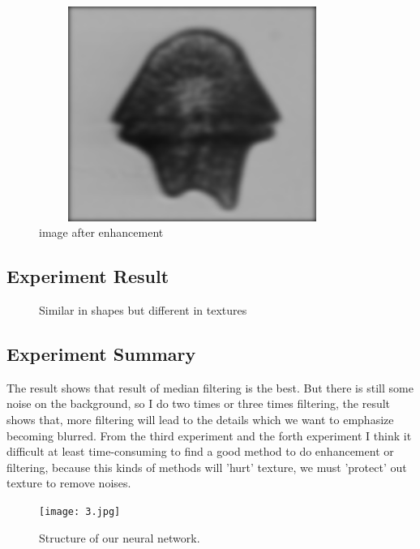 \documentclass{article}
\begin{document}
\begin{figure}[!ht]
\centering
\includegraphics[width=10cm,height=7cm]{5.png}
\caption{image after enhancement}
\hspace{0.05in}
\label{fig: image after enhancement}
\end{figure}

\subsection{Experiment Result}

\begin{figure}[!ht] 
  \centering 
  \hspace{0.3in} 
   \hspace{0.3in} 
   \hspace{0.3in} 
   \hspace{0.3in} 
  \caption{Similar in shapes but different in textures} 
  \label{fig:subfig} %
\end{figure}

\subsection{Experiment Summary}
The result shows that result of median filtering is the best. But there is still some noise on the background, so I do two times or three times filtering, the result shows that, more filtering will lead to the details which we want to emphasize becoming blurred. From the third experiment and the forth experiment I think it difficult at least time-consuming to find a good method to do enhancement or filtering, because this kinds of methods will 'hurt' texture, we must 'protect' out texture to remove noises.


\begin{figure}[!ht]
\centering
\texttt{[image: 3.jpg]}
\caption{Structure of our neural network.}
\hspace{0.05in}
\label{fig:network}
\end{figure}
\end{document}
